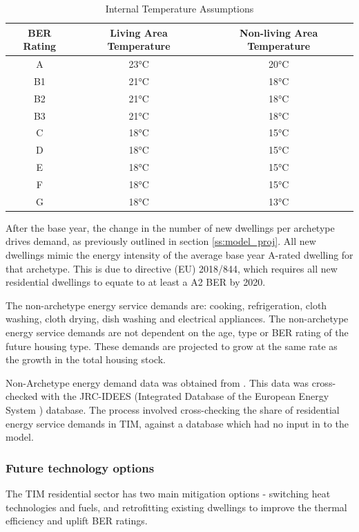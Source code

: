 \documentclass[gmd,manuscript]{copernicus}
\begin{document}
\begin{table}[ht]
 \centering
 \footnotesize
 \caption{Internal Temperature Assumptions}
 \begin{tabular}{ccc}
 \hline 
 BER Rating & Living Area Temperature & Non-living Area Temperature \\
 \hline
 A & 23°C & 20°C \\
 B1 & 21°C & 18°C \\
 B2	& 21°C & 18°C \\
 B3 & 21°C & 18°C \\
 C & 18°C & 15°C \\
 D & 18°C & 15°C \\
 E & 18°C & 15°C \\
 F & 18°C & 15°C \\
 G & 18°C & 13°C \\ \hline
 \end{tabular}
 
 \label{Internal Temperature Assumptions}
\end{table}

After the base year, the change in the number of new dwellings per archetype drives demand, as previously outlined in section \ref{ss:model_proj}. All new dwellings mimic the energy intensity of the average base year A-rated dwelling for that archetype. This is due to directive (EU) 2018/844, which requires all new residential dwellings to equate to at least a A2 BER by 2020. 

The non-archetype energy service demands are: cooking, refrigeration, cloth washing, cloth drying, dish washing and electrical appliances. The non-archetype energy service demands are not dependent on the age, type or BER rating of the future housing type. These demands are projected to grow at the same rate as the growth in the total housing stock. 

Non-Archetype energy demand data was obtained from \citet{SEAISustainableAuthorityofIreland2018}. This data was cross-checked with the JRC-IDEES (Integrated Database of the European Energy System ) database. The process involved cross-checking the share of residential energy service demands in TIM, against a database which had no input in to the model.

\subsubsection{Future technology options}
The TIM residential sector has two main mitigation options - switching heat technologies and fuels, and retrofitting existing dwellings to improve the thermal efficiency and uplift BER ratings. 
\end{document}
